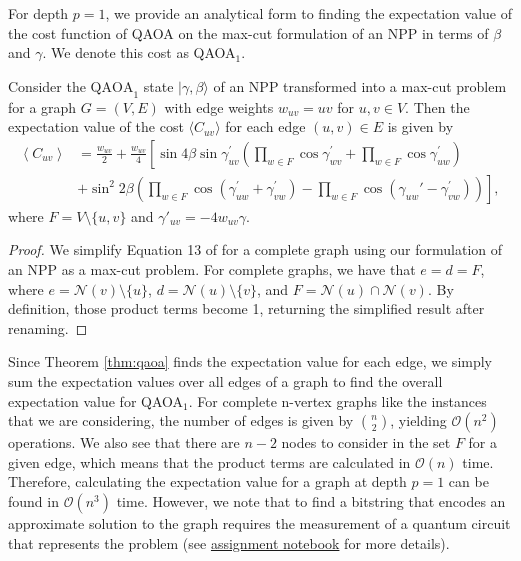     For depth $p=1$, we provide an analytical form to finding the expectation value of the cost function of QAOA on the max-cut formulation of an NPP in terms of $\beta$ and $\gamma$. We denote this cost as QAOA$_1$.
    \begin{widetext}
        \begin{theorem} \label{thm:qaoa}
            Consider the $\mathrm{QAOA}_1$ state $|\gamma,\beta\rangle$ of an NPP transformed into a max-cut problem for a graph $G=(V,E)$ with edge weights $w_{uv}=uv$ for $u,v\in V$. Then the expectation value of the cost $\langle C_{uv}\rangle$ for each edge $(u,v)\in E$ is given by
            \begin{align*}
                \left\langle C_{u v}\right\rangle & =\frac{w_{u v}}{2}+\frac{w_{u v}}{4}\left[\sin 4 \beta \sin \gamma_{u v}^{\prime}\left(\prod_{w \in F} \cos \gamma_{w v}^{\prime}+\prod_{w \in F} \cos \gamma_{u w}^{\prime}\right)\right. \\ 
                & \left.+\sin ^2 2 \beta \left(\prod_{w \in F} \cos \left(\gamma_{u w}^{\prime}+\gamma_{v w}^{\prime}\right)-\prod_{w \in F} \cos \left(\gamma_{u w}'-\gamma_{v w}^{\prime}\right)\right)\right],
            \end{align*}
            where $F = V\setminus\{u,v\}$ and $\gamma'_{uv} = -4w_{uv}\gamma$.
        \end{theorem}
    \end{widetext}
        \begin{proof}
            We simplify Equation 13 of \cite{vijendran2023expressive} for a complete graph using our formulation of an NPP as a max-cut problem. For complete graphs, we have that $e=d=F$, where $e=\mathcal{N}(v)\setminus\{u\}$, $d=\mathcal{N}(u)\setminus\{v\}$, and $F=\mathcal{N}(u)\cap\mathcal{N}(v)$. By definition, those product terms become 1, returning the simplified result after renaming.
        \end{proof}
        Since Theorem \ref{thm:qaoa} finds the expectation value for each edge, we simply sum the expectation values over all edges of a graph to find the overall expectation value for QAOA$_1$. For complete n-vertex graphs like the instances that we are considering, the number of edges is given by $\binom{n}{2}$, yielding $\mathcal{O}(n^2)$ operations. We also see that there are $n-2$ nodes to consider in the set $F$ for a given edge, which means that the product terms are calculated in $\mathcal{O}(n)$ time. Therefore, calculating the expectation value for a graph at depth $p=1$ can be found in $\mathcal{O}(n^3)$ time. However, we note that to find a bitstring that encodes an approximate solution to the graph requires the measurement of a quantum circuit that represents the problem (see \href{https://github.com/yangdabei/quantum-number-partitioning/blob/main/assignment-files/qaoa-maxcut/QAOA%20Practice%20Questions.ipynb}{assignment notebook} for more details).

